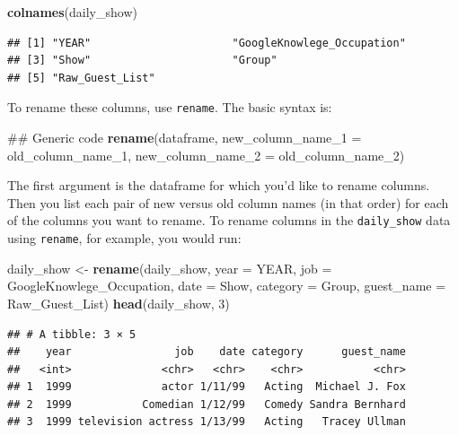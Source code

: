 \documentclass[]{book}
\makeatletter
\newenvironment{Shaded}{\begin{snugshade}}{\end{snugshade}}
\newcommand{\KeywordTok}[1]{\textcolor[rgb]{0.13,0.29,0.53}{\textbf{{#1}}}}
\newcommand{\DataTypeTok}[1]{\textcolor[rgb]{0.13,0.29,0.53}{{#1}}}
\newcommand{\DecValTok}[1]{\textcolor[rgb]{0.00,0.00,0.81}{{#1}}}
\newcommand{\StringTok}[1]{\textcolor[rgb]{0.31,0.60,0.02}{{#1}}}
\newcommand{\NormalTok}[1]{{#1}}
\newenvironment{kframe}{%
\medskip{}
\setlength{\fboxsep}{.8em}
 \def\at@end@of@kframe{}%
 \ifinner\ifhmode%
  \def\at@end@of@kframe{\end{minipage}}%
  \begin{minipage}{\columnwidth}%
 \fi\fi%
 \def\FrameCommand##1{\hskip\@totalleftmargin \hskip-\fboxsep
 \colorbox{shadecolor}{##1}\hskip-\fboxsep
     \hskip-\linewidth \hskip-\@totalleftmargin \hskip\columnwidth}%
 \MakeFramed {\advance\hsize-\width
   \@totalleftmargin\z@ \linewidth\hsize
   \@setminipage}}%
 {\par\unskip\endMakeFramed%
 \at@end@of@kframe}
\renewenvironment{Shaded}{\begin{kframe}}{\end{kframe}}
\makeatother
\begin{document}
\begin{Shaded}
\begin{Highlighting}[]
\KeywordTok{colnames}\NormalTok{(daily_show)}
\end{Highlighting}
\end{Shaded}

\begin{verbatim}
## [1] "YEAR"                      "GoogleKnowlege_Occupation"
## [3] "Show"                      "Group"                    
## [5] "Raw_Guest_List"
\end{verbatim}

To rename these columns, use \texttt{rename}. The basic syntax is:

\begin{Shaded}
\begin{Highlighting}[]
\NormalTok{## Generic code}
\KeywordTok{rename}\NormalTok{(dataframe, }
       \DataTypeTok{new_column_name_1 =} \NormalTok{old_column_name_1,}
       \DataTypeTok{new_column_name_2 =} \NormalTok{old_column_name_2)}
\end{Highlighting}
\end{Shaded}

The first argument is the dataframe for which you'd like to rename
columns. Then you list each pair of new versus old column names (in that
order) for each of the columns you want to rename. To rename columns in
the \texttt{daily\_show} data using \texttt{rename}, for example, you
would run:

\begin{Shaded}
\begin{Highlighting}[]
\NormalTok{daily_show <-}\StringTok{ }\KeywordTok{rename}\NormalTok{(daily_show,}
                     \DataTypeTok{year =} \NormalTok{YEAR,}
                     \DataTypeTok{job =} \NormalTok{GoogleKnowlege_Occupation, }
                     \DataTypeTok{date =} \NormalTok{Show, }
                     \DataTypeTok{category =} \NormalTok{Group,}
                     \DataTypeTok{guest_name =} \NormalTok{Raw_Guest_List)}
\KeywordTok{head}\NormalTok{(daily_show, }\DecValTok{3}\NormalTok{)}
\end{Highlighting}
\end{Shaded}

\begin{verbatim}
## # A tibble: 3 × 5
##    year                job    date category      guest_name
##   <int>              <chr>   <chr>    <chr>           <chr>
## 1  1999              actor 1/11/99   Acting  Michael J. Fox
## 2  1999           Comedian 1/12/99   Comedy Sandra Bernhard
## 3  1999 television actress 1/13/99   Acting   Tracey Ullman
\end{verbatim}
\end{document}
